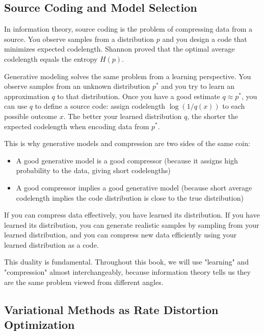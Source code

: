 \vspace{1.5em}

\subsection{Source Coding and Model Selection}

In information theory, source coding is the problem of compressing data from a source. You observe samples from a distribution $p$ and you design a code that minimizes expected codelength. Shannon proved that the optimal average codelength equals the entropy $H(p)$.

Generative modeling solves the same problem from a learning perspective. You observe samples from an unknown distribution $p^*$ and you try to learn an approximation $q$ to that distribution. Once you have a good estimate $q \approx p^*$, you can use $q$ to define a source code: assign codelength $\log(1/q(x))$ to each possible outcome $x$. The better your learned distribution $q$, the shorter the expected codelength when encoding data from $p^*$.

This is why generative models and compression are two sides of the same coin:

\begin{itemize}
\item A good generative model is a good compressor (because it assigns high probability to the data, giving short codelengths)
\item A good compressor implies a good generative model (because short average codelength implies the code distribution is close to the true distribution)
\end{itemize}

If you can compress data effectively, you have learned its distribution. If you have learned its distribution, you can generate realistic samples by sampling from your learned distribution, and you can compress new data efficiently using your learned distribution as a code.

This duality is fundamental. Throughout this book, we will use "learning" and "compression" almost interchangeably, because information theory tells us they are the same problem viewed from different angles.

\subsection{Variational Methods as Rate Distortion Optimization}

